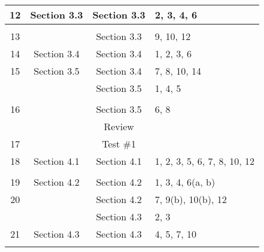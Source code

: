 \begin{center}
\begin{tabular}[h]{| c | c | c | l |}
 12  &  Section 3.3  &  Section 3.3  &  2, 3, 4, 6  \\ \hline
     &               &               &   \\ \hline
 13  &               &  Section 3.3  &  9, 10, 12  \\ \hline
 14  &  Section 3.4  &  Section 3.4  &  1, 2, 3, 6 \\ \hline
 15  &  Section 3.5  &  Section 3.4  &  7, 8, 10, 14  \\
     &               &  Section 3.5  &  1, 4, 5  \\ \hline
     &               &               &  \\ \hline
 16  &               &  Section 3.5  &  6, 8  \\
     &               &  Review       &  \\ \hline
 17  &               &  Test \#1     &  \\ \hline
 18  &  Section 4.1  &  Section 4.1  &  1, 2, 3, 5, 6, 7, 8, 10, 12  \\ \hline
     &               &               &  \\ \hline
 19  &  Section 4.2  &  Section 4.2  &  1, 3, 4, 6(a, b)  \\ \hline
 20  &               &  Section 4.2  &  7, 9(b), 10(b), 12 \\
     &               &  Section 4.3  &  2, 3  \\ \hline
 21  &  Section 4.3  &  Section 4.3  &  4, 5, 7, 10  \\ \hline
     &               &               &  \\ \hline
\end{tabular}
\end{center}


